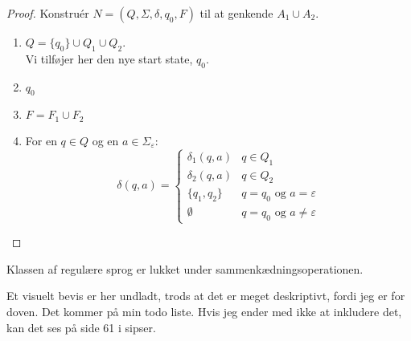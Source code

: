 \begin{proof}
	Konstruér $N = (Q, \Sigma, \delta, q_{0}, F)$ til at genkende $A_1 \cup A_{2}$.
	\begin{enumerate}
		\item $Q = \{q_{0}\} \cup Q_{1} \cup Q_{2}$.\\ Vi tilføjer her den nye start state, $q_{0}$.
		\item $q_{0}$
		\item $F = F_{1} \cup F_{2}$
		\item For en $q \in Q$ og en $a \in \Sigma_{\varepsilon}$:
		      \begin{equation*}
			      \delta(q,a) = \begin{cases}
				      \delta_{1}(q,a)  & q \in Q_{1}                              \\
				      \delta_{2}(q,a)  & q \in Q_{2}                              \\
				      \{q_{1}, q_{2}\} & q = q_{0} \text{ og } a = \varepsilon    \\
				      \emptyset        & q = q_{0} \text{ og } a \neq \varepsilon
			      \end{cases}
		      \end{equation*}
	\end{enumerate}

\end{proof}


\begin{theorem}
	\label{the:sipser1.47}
	Klassen af regulære sprog er lukket under sammenkædningsoperationen.
\end{theorem}

Et visuelt bevis er her undladt, trods at det er meget deskriptivt, fordi jeg er for doven. Det kommer på min todo liste. Hvis jeg ender med ikke at inkludere det, kan det ses på side 61 i sipser.


